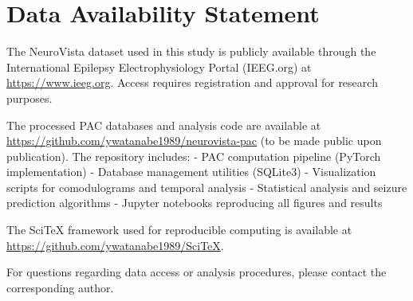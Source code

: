 
\section*{Data Availability Statement}

The NeuroVista dataset used in this study is publicly available through the International Epilepsy Electrophysiology Portal (IEEG.org) at \url{https://www.ieeg.org}. Access requires registration and approval for research purposes. 

The processed PAC databases and analysis code are available at \url{https://github.com/ywatanabe1989/neurovista-pac} (to be made public upon publication). The repository includes:
- PAC computation pipeline (PyTorch implementation)
- Database management utilities (SQLite3)
- Visualization scripts for comodulograms and temporal analysis
- Statistical analysis and seizure prediction algorithms
- Jupyter notebooks reproducing all figures and results

The SciTeX framework used for reproducible computing is available at \url{https://github.com/ywatanabe1989/SciTeX}.

For questions regarding data access or analysis procedures, please contact the corresponding author.

\label{data and code availability}

